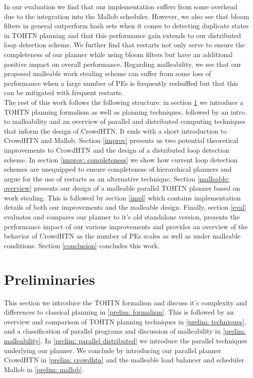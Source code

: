 \documentclass[enabledeprecatedfontcommands,12pt,a4paper,twoside]{scrartcl}
\numberwithin{equation}{section}
\begin{document}
In our evaluation we find that our implementation suffers from some overhead due to the integration into the Mallob scheduler.
However, we also see that bloom filters in general outperform hash sets when it comes to detecting duplicate states in TOHTN planning and that this performance gain extends to our distributed loop detection scheme. We further find that restarts not only serve to ensure the completeness of our planner while using bloom filters but have an additional positive impact on overall performance. Regarding malleability, we see that our proposed malleable work stealing scheme can suffer from some loss of performance when a large number of PEs is frequently reshuffled but that this can be mitigated with frequent restarts. \\

The rest of this work follows the following structure: in section \ref{prelim} we introduce a TOHTN planning formalism as well as planning techniques, followed by an intro to malleability and an overview of parallel and distributed computing techniques that inform the design of CrowdHTN. It ends with a short introduction to CrowdHTN and Mallob. Section \ref{improv} presents us two potential theoretical improvements to CrowdHTN and the design of a distributed loop detection scheme. In section \ref{improv: completeness} we show how current loop detection schemes are unequipped to ensure completeness of hierarchical planners and argue for the use of restarts as an alternative technique. Section \ref{malleable: overview} presents our design of a malleable parallel TOHTN planner based on work stealing. This is followed by section \ref{impl} which contains implementation details of both our improvements and the malleable design. Finally, section \ref{eval} evaluates and compares our planner to it's old standalone version, presents the performance impact of our various improvements and provides an overview of the behavior of CrowdHTN as the number of PEs scales as well as under malleable conditions. Section \ref{conclusion} concludes this work.
	
\clearpage
\pagebreak
\section{Preliminaries}
\label{prelim}
This section we introduce the TOHTN formalism and discuss it's complexity and differences to classical planning in \ref{prelim: formalism}. This is followed by an overview and comparison of TOHTN planning techniques in \ref{prelim: techniques}, and a classification of parallel programs and discussion of malleability in \ref{prelim: malleability}. In \ref{prelim: parallel distributed} we introduce the parallel techniques underlying our planner. We conclude by introducing our parallel planner CrowdHTN in \ref{prelim: crowdhtn} and the malleable load balancer and scheduler Mallob in \ref{prelim: mallob}.






\end{document}
